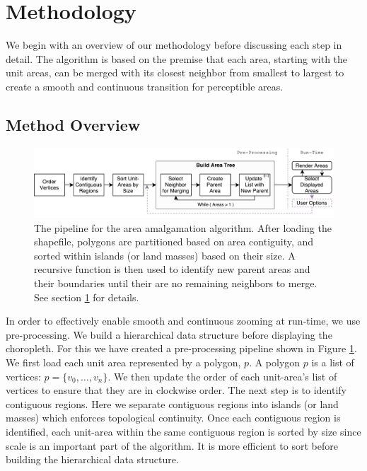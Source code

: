 \section{Methodology} \label{methodology}
We begin with an overview of our methodology before discussing each step in detail. The algorithm is based on the premise that each area, starting with the unit areas, can be merged with its closest neighbor from smallest to largest to create a smooth and continuous transition for perceptible areas.

\subsection{Method Overview} \label{overview}

\begin{figure}[t] 
\centering
\includegraphics[width=1\textwidth]{images/HorizontalFlow2}
\caption{ The pipeline for the area amalgamation algorithm. After loading the shapefile, polygons are partitioned based on area contiguity, and sorted within islands (or land masses) based on their size. A recursive function is then used to identify new parent areas and their boundaries until their are no remaining neighbors to merge. See section \ref{methodology} for details. } \label{fig:procedure} \vspace{-0.2cm}
\end{figure}

In order to effectively enable smooth and continuous zooming at run-time, we use pre-processing. We build a hierarchical data structure before displaying the choropleth. For this we have created a pre-processing pipeline shown in Figure \ref{fig:procedure}. We first load each unit area represented by a polygon, $p$. A polygon $p$ is a list of vertices: $p = \{v_0,\dots,v_n\}$. We then update the order of each unit-area's list of vertices to ensure that they are in clockwise order. The next step is to identify contiguous regions. Here we separate contiguous regions into islands (or land masses) which enforces topological continuity. Once each contiguous region is identified, each unit-area within the same contiguous region is sorted by size since scale is an important part of the algorithm. It is more efficient to sort before building the hierarchical data structure.

